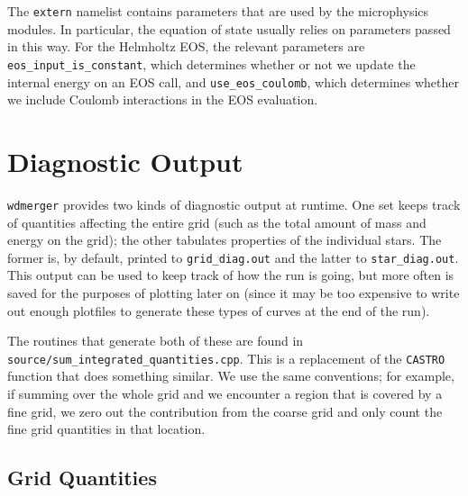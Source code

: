 \documentclass[12pt]{book}
\begin{document}
The \texttt{extern} namelist contains parameters that are used by the microphysics modules. In particular, 
the equation of state usually relies on parameters passed in this way. For the Helmholtz EOS, the relevant 
parameters are \texttt{eos\_input\_is\_constant}, which determines whether or not we update the internal 
energy on an EOS call, and \texttt{use\_eos\_coulomb}, which determines whether we include Coulomb 
interactions in the EOS evaluation.



\section{Diagnostic Output}

\texttt{wdmerger} provides two kinds of diagnostic output at runtime. One set keeps track of quantities affecting 
the entire grid (such as the total amount of mass and energy on the grid); the other tabulates properties 
of the individual stars. The former is, by default, printed to \texttt{grid\_diag.out} and the latter to 
\texttt{star\_diag.out}. This output can be used to keep track of how the run is going, but more often is 
saved for the purposes of plotting later on (since it may be too expensive to write out enough plotfiles to 
generate these types of curves at the end of the run).

The routines that generate both of these are found in \\\texttt{source/sum\_integrated\_quantities.cpp}. 
This is a replacement of the \texttt{CASTRO} function that does something similar. We use the same 
conventions; for example, if summing over the whole grid and we encounter a region that is covered by 
a fine grid, we zero out the contribution from the coarse grid and only count the fine grid quantities 
in that location.

\subsection{Grid Quantities}
\end{document}
